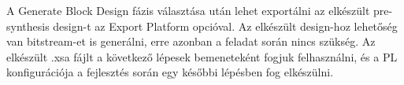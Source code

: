 A Generate Block Design fázis választása után lehet exportálni az elkészült pre-synthesis design-t az Export Platform opcióval. Az elkészült design-hoz lehetőség van bitstream-et is generálni, erre azonban a feladat során nincs szükség. Az elkészült .xsa fájlt a következő lépesek bemeneteként fogjuk felhasználni, és a PL konfigurációja a fejlesztés során egy későbbi lépésben fog elkészülni.
